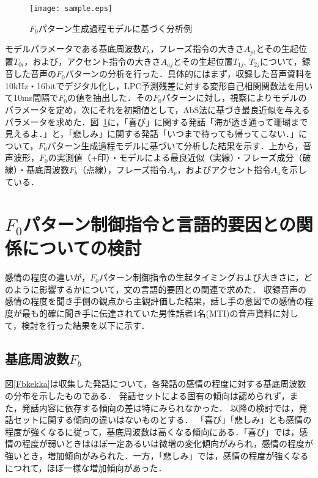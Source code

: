 \documentclass[japanese]{jnlp_1.3b}
\begin{document}
\begin{figure}[b]
\begin{center}
    \texttt{[image: sample.eps]}
\end{center}
\caption{$F_0$パターン生成過程モデルに基づく分析例}
\label{sample}
\end{figure}

モデルパラメータである基底周波数$F_b$，フレーズ指令の大きさ$A_{pi}$とその生起位置$T_{0i}$，および，アクセント指令の大きさ$A_{aj}$とその生起位置$T_{1j}$,  $T_{2j}$について，録音した音声の$F_0$パターンの分析を行った．具体的にはまず，収録した音声資料を10kHz・16bitでデジタル化し，LPC予測残差に対する変形自己相関関数法を用いて10ms間隔で$F_0$の値を抽出した．その$F_0$パターンに対し，視察によりモデルのパラメータを定め，次にそれを初期値として，AbS法に基づき最良近似を与えるパラメータを求めた．図~\ref{sample}に，「喜び」に関する発話「海が透き通って珊瑚まで見えるよ．」と，「悲しみ」に関する発話「いつまで待っても帰ってこない．」について，$F_0$パターン生成過程モデルに基づいて分析した結果を示す．上から，音声波形，$F_0$の実測値（+印）・モデルによる最良近似（実線）・フレーズ成分（破線）・基底周波数$F_b$（点線），フレーズ指令$A_p$，およびアクセント指令$A_a$を示している．


\section{$F_0$パターン制御指令と言語的要因との関係についての検討}\label{ex}
感情の程度の違いが，$F_0$パターン制御指令の生起タイミングおよび大きさに，どのように影響するかについて，文の言語的要因との関連で求めた．
収録音声の感情の程度を聞き手側の観点から主観評価した結果，話し手の意図での感情の程度が最も的確に聞き手に伝達されていた男性話者1名(MTI)の音声資料に対して，検討を行った結果を以下に示す．

\subsection{基底周波数$F_b$}
図\ref{Fbkekka}は収集した発話について，各発話の感情の程度に対する基底周波数の分布を示したものである．
発話セットによる固有の傾向は認められず，また，発話内容に依存する傾向の差は特にみられなかった．
以降の検討では，発話セットに関する傾向の違いはないものとする．
「喜び」「悲しみ」とも感情の程度が強くなるに従って，基底周波数は高くなる傾向にある．「喜び」では，感情の程度が弱いときはほぼ一定あるいは微増の変化傾向がみられ，感情の程度が強いとき，増加傾向がみられた．一方，「悲しみ」では，感情の程度が強くなるにつれて，ほぼ一様な増加傾向があった．
\end{document}
